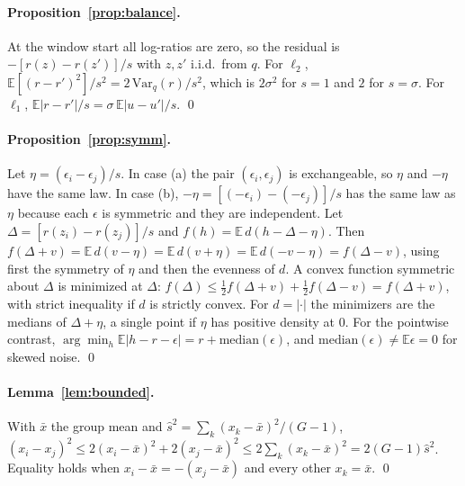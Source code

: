 \paragraph{Proposition~\ref{prop:balance}.}
At the window start all log-ratios are zero, so the residual is
$-[r(z) - r(z')]/s$ with $z, z'$ i.i.d.\ from $q$. For $\ell_2$,
$\mathbb{E}[(r - r')^2]/s^2 = 2\,\mathrm{Var}_q(r)/s^2$, which is $2\sigma^2$ for
$s = 1$ and $2$ for $s = \sigma$. For $\ell_1$,
$\mathbb{E}|r - r'|/s = \sigma\,\mathbb{E}|u - u'|/s$. \qed

\paragraph{Proposition~\ref{prop:symm}.}
Let $\eta = (\epsilon_i - \epsilon_j)/s$. In case (a) the pair
$(\epsilon_i, \epsilon_j)$ is exchangeable, so $\eta$ and $-\eta$ have the same
law. In case (b), $-\eta = [(-\epsilon_i) - (-\epsilon_j)]/s$ has the same law
as $\eta$ because each $\epsilon$ is symmetric and they are independent.
Let $\Delta = [r(z_i) - r(z_j)]/s$ and $f(h) = \mathbb{E}\,d(h - \Delta - \eta)$.
Then $f(\Delta + v) = \mathbb{E}\,d(v - \eta) = \mathbb{E}\,d(v + \eta) =
\mathbb{E}\,d(-v - \eta) = f(\Delta - v)$, using first the symmetry of $\eta$
and then the evenness of $d$. A convex function symmetric about $\Delta$ is
minimized at $\Delta$:
$f(\Delta) \le \tfrac12 f(\Delta + v) + \tfrac12 f(\Delta - v) = f(\Delta+v)$,
with strict inequality if $d$ is strictly convex. For $d = |\cdot|$ the
minimizers are the medians of $\Delta + \eta$, a single point if $\eta$ has
positive density at $0$. For the pointwise contrast,
$\arg\min_h \mathbb{E}|h - r - \epsilon| = r + \mathrm{median}(\epsilon)$, and
$\mathrm{median}(\epsilon) \ne \mathbb{E}\epsilon = 0$ for skewed noise. \qed

\paragraph{Lemma~\ref{lem:bounded}.}
With $\bar x$ the group mean and $\hat s^2 = \sum_k (x_k - \bar x)^2/(G-1)$,
$(x_i - x_j)^2 \le 2(x_i - \bar x)^2 + 2(x_j - \bar x)^2
\le 2\sum_k (x_k - \bar x)^2 = 2(G-1)\hat s^2$. Equality holds when
$x_i - \bar x = -(x_j - \bar x)$ and every other $x_k = \bar x$. \qed

